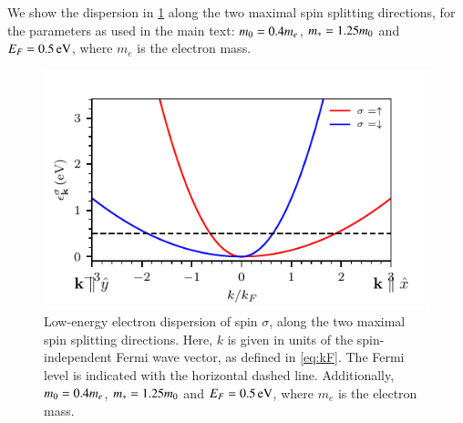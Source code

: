 \documentclass[aps,prb,reprint,twocolumns,superscriptaddress,nofootinbib]{revtex4-2}
\begin{document}
	We show the dispersion in \cref{fig:dispersion} along the two maximal spin splitting directions, for the parameters as used in the main text: $m_0=0.4 m_e$, $m_*=1.25 m_0$ and $E_F=\SI{0.5}{eV}$, where $m_e$ is the electron mass.
	\begin{figure}
		\centering
		\includegraphics{dispersion}
		\caption{Low-energy electron dispersion of spin $\sigma$, along the two maximal spin splitting directions. Here, $k$ is given in units of the spin-independent Fermi wave vector, as defined in \cref{eq:kF}. The Fermi level is indicated with the horizontal dashed line. Additionally, $m_0=0.4 m_e$, $m_*=1.25 m_0$ and $E_F=\SI{0.5}{eV}$, where $m_e$ is the electron mass. \label{fig:dispersion}} 
	\end{figure}
	
\end{document}
